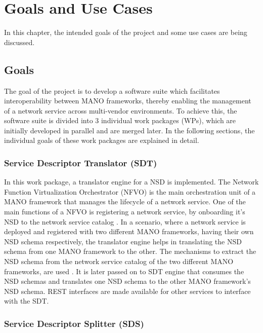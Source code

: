 \chapter{Goals and Use Cases}
\label{ch:Goals and Use Cases}

In this chapter, the intended goals of the project and some use cases are being discussed.

\section{Goals}

The goal of the project is to develop a software suite which facilitates interoperability between MANO frameworks, thereby enabling the management of a network service across multi-vendor environments. To achieve this, the software suite is divided into 3 individual work packages (WPs), which are initially developed in parallel and are merged later. In the following sections, the individual goals of these work packages are explained in detail.

\subsection{Service Descriptor Translator (SDT)}

In this work package, a translator engine for a NSD is implemented. The Network Function Virtualization Orchestrator (NFVO) is the main orchestration unit of a MANO framework that manages the lifecycle of a network service. One of the main functions of a NFVO is registering a network service, by onboarding it's NSD to the network service catalog . In a scenario, where a network service is deployed and registered with two different MANO
frameworks, having their own NSD schema respectively, the translator engine helps in translating the NSD schema from one MANO framework to the other.
The mechanisms to extract the NSD schema from the network service catalog of the two different MANO frameworks, are used . It is later passed on to SDT engine that consumes the NSD schemas and translates one NSD schema to the other MANO framework's NSD schema. REST interfaces are made available for other services to interface with the SDT.

\subsection{Service Descriptor Splitter (SDS)}

